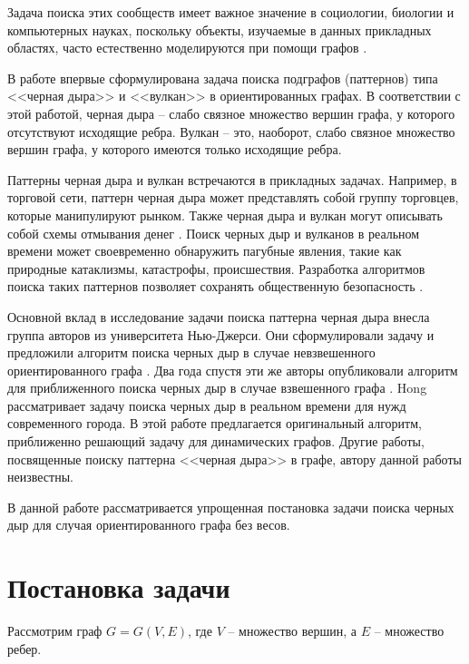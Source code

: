 \documentclass[12pt,a4paper,oneside,openany]{article}
\theoremstyle{definition}
\theoremstyle{lemma}
\theoremstyle{remark}
\begin{document}
Задача поиска этих сообществ имеет важное значение в социологии, биологии и компьютерных науках,
поскольку объекты, изучаемые в данных прикладных областях, часто естественно моделируются при
помощи графов \cite{fortunato2010community}.

В работе \cite{li2010detecting} впервые сформулирована задача поиска подграфов (паттернов)
типа <<черная дыра>> и <<вулкан>> в ориентированных графах. В соответствии с этой работой,
черная дыра -- слабо связное множество вершин графа, у которого отсутствуют исходящие ребра.
Вулкан -- это, наоборот, слабо связное множество вершин графа, у которого имеются только исходящие ребра.

Паттерны черная дыра и вулкан встречаются в прикладных задачах. Например, в торговой сети,
паттерн черная дыра может представлять собой группу торговцев, которые манипулируют рынком.
Также черная дыра и вулкан могут описывать собой схемы отмывания денег \cite{semenov2017survey}.
Поиск черных дыр и вулканов в реальном времени может своевременно обнаружить пагубные явления,
такие как природные катаклизмы, катастрофы, происшествия.
Разработка алгоритмов поиска таких паттернов позволяет сохранять общественную безопасность \cite{hong2015detecting}.

Основной вклад в исследование задачи поиска паттерна черная дыра внесла группа авторов из университета Нью-Джерси.
Они сформулировали задачу и предложили алгоритм поиска черных дыр в случае невзвешенного ориентированного графа \cite{li2010detecting}.
Два  года спустя эти же авторы опубликовали алгоритм для приближенного поиска черных дыр в случае взвешенного графа \cite{li2012mining,li2014mining}.
Hong \cite{hong2015detecting} рассматривает задачу поиска черных дыр в реальном времени для  нужд современного города.
В этой работе предлагается оригинальный алгоритм, приближенно решающий задачу для динамических графов.
Другие работы, посвященные поиску паттерна <<черная дыра>> в графе, автору данной работы неизвестны.

В данной работе рассматривается упрощенная постановка задачи поиска черных дыр для случая ориентированного графа без весов.

\cleardoublepage
\section{Постановка задачи}\label{sec:taskstatement}

Рассмотрим граф $G = G(V,E)$, где $V$ -- множество вершин, а $E$ -- множество ребер.
\end{document}

